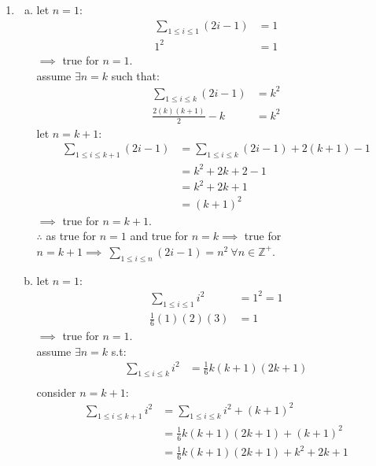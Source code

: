 \documentclass{article}
\begin{document}
\begin{enumerate}
  \item
  \begin{enumerate}[(a)]
    \item %
          let $n=1$:
          \begin{align*}
            \sum_{1\le i\le1}(2i-1)&=1\\
            1^{2}&=1
          \end{align*}
          $\implies$ true for $n=1$.\\
          assume $\exists n=k$ such that:
          \begin{align*}
            \sum_{1\le i\le k}(2i-1)&=k^{2}\\
            \frac{2(k)(k+1)}{2}-k&=k^{2}
          \end{align*}
          let $n=k+1$:
          \begin{align*}
            \sum_{1\le i \le k+1}(2i-1)&=\sum_{1\le i \le k}(2i-1)+2(k+1)-1\\
                                       &=k^{2}+2k+2-1\\
                                       &=k^{2}+2k+1\\
                                       &=(k+1)^{2}
          \end{align*}
          $\implies$ true for $n=k+1$.\\
          $\therefore$ as true for $n=1$ and true for $n=k\implies$ true for $n=k+1\implies\ \sum_{1\le i \le n}(2i-1)=n^{2}\ \forall n\in \mathbb{Z}^{+}.$
    \item %
          let $n=1$:
          \begin{align*}
            \sum_{1\le i\le 1}i^{2}&=1^{2}=1\\
            \frac{1}{6}(1)(2)(3)&=1
          \end{align*}
          $\implies$ true for $n=1$.\\
          assume $\exists n=k$ s.t:
          \begin{align*}
            \sum_{1\le i \le k}i^{2}&=\frac{1}{6}k(k+1)(2k+1)\\
          \end{align*}
          consider $n=k+1$:
          \begin{align*}
            \sum_{1\le i \le k+1}i^{2}&=\sum_{1\le i \le k}i^{2}+(k+1)^{2}\\
                                      &=\frac{1}{6}k(k+1)(2k+1)+(k+1)^{2}\\
                                      &=\frac{1}{6}k(k+1)(2k+1)+k^{2}+2k+1\\

\end{align*}
\end{enumerate}
\end{enumerate}
\end{document}
